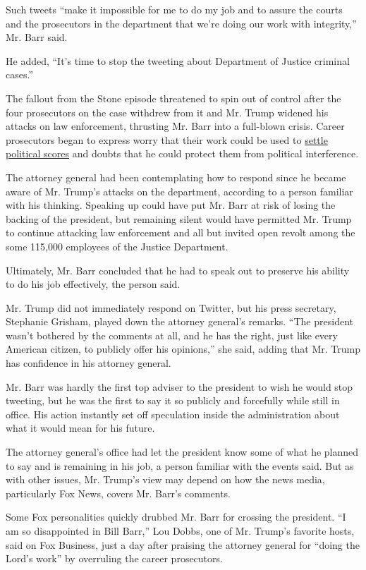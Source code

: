 Such tweets ``make it impossible for me to do my job and to assure the
courts and the prosecutors in the department that we're doing our work
with integrity,'' Mr. Barr said.

He added, ``It's time to stop the tweeting about Department of Justice
criminal cases.''

The fallout from the Stone episode threatened to spin out of control
after the four prosecutors on the case withdrew from it and Mr. Trump
widened his attacks on law enforcement, thrusting Mr. Barr into a
full-blown crisis. Career prosecutors began to express worry that their
work could be used to
\href{https://www.nytimes3xbfgragh.onion/2020/02/12/us/politics/justice-department-roger-stone-sentencing.html}{settle
political scores} and doubts that he could protect them from political
interference.

The attorney general had been contemplating how to respond since he
became aware of Mr. Trump's attacks on the department, according to a
person familiar with his thinking. Speaking up could have put Mr. Barr
at risk of losing the backing of the president, but remaining silent
would have permitted Mr. Trump to continue attacking law enforcement and
all but invited open revolt among the some 115,000 employees of the
Justice Department.

Ultimately, Mr. Barr concluded that he had to speak out to preserve his
ability to do his job effectively, the person said.

Mr. Trump did not immediately respond on Twitter, but his press
secretary, Stephanie Grisham, played down the attorney general's
remarks. ``The president wasn't bothered by the comments at all, and he
has the right, just like every American citizen, to publicly offer his
opinions,'' she said, adding that Mr. Trump has confidence in his
attorney general.

Mr. Barr was hardly the first top adviser to the president to wish he
would stop tweeting, but he was the first to say it so publicly and
forcefully while still in office. His action instantly set off
speculation inside the administration about what it would mean for his
future.

The attorney general's office had let the president know some of what he
planned to say and is remaining in his job, a person familiar with the
events said. But as with other issues, Mr. Trump's view may depend on
how the news media, particularly Fox News, covers Mr. Barr's comments.

Some Fox personalities quickly drubbed Mr. Barr for crossing the
president. ``I am so disappointed in Bill Barr,'' Lou Dobbs, one of Mr.
Trump's favorite hosts, said on Fox Business, just a day after praising
the attorney general for ``doing the Lord's work'' by overruling the
career prosecutors.

